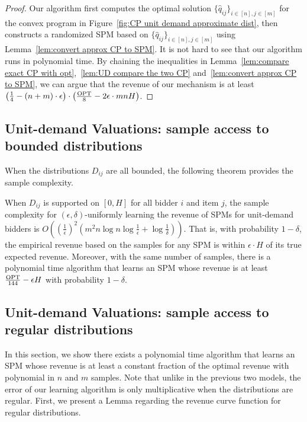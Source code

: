 \begin{proof}
	Our algorithm first computes the optimal solution $\{\hat{q}_{ij}\}_{i\in[n],j\in[m]}$ for the convex program in Figure~\ref{fig:CP unit demand approximate dist}, then  constructs a randomized SPM based on $\{\hat{q}_{ij}\}_{i\in[n],j\in[m]}$ using Lemma~\ref{lem:convert approx CP to SPM}. It is not hard to see that our algorithm runs in polynomial time. By chaining the inequalities in Lemma~\ref{lem:compare exact CP with opt},~\ref{lem:UD compare the two CP} and~\ref{lem:convert approx CP to SPM}, we can argue that the revenue of our mechanism is at least $\left(\frac{1}{4}-(n+m)\cdot \epsilon\right)\cdot\left(\frac{\text{OPT}}{8}-2\epsilon\cdot mnH\right)$.
\end{proof}

\subsection{Unit-demand Valuations: sample access to bounded distributions} 

When the distributions $D_{ij}$ are all bounded, the following theorem provides the sample complexity.
\begin{theorem}\cite{MorgensternR16}\label{thm:UD bounded}
	When $D_{ij}$ is supported on $[0,H]$ for all bidder $i$ and item $j$, the sample complexity for $(\epsilon,\delta)$-uniformly learning the revenue of SPMs for unit-demand bidders is $O\left(\left(\frac{1}{\epsilon}\right)^2 \left(m^2 n\log n\log \frac{1}{\epsilon} + \log \frac{1}{\delta}\right)\right)$. That is, with probability $1-\delta$, the empirical revenue based on the samples for any SPM is within $\epsilon\cdot H$ of its true expected revenue. %
	{Moreover, with the same number of samples, there is a polynomial time algorithm that learns an SPM whose revenue is at least $\frac{\text{OPT}}{144}-\epsilon H$ with probability $1-\delta$. }\end{theorem}

\subsection{Unit-demand Valuations: sample access to regular distributions}\label{sec:unit-demand regular}
In this section, we show there exists a polynomial time algorithm that learns an SPM whose revenue is at least a constant fraction of the optimal revenue with polynomial in $n$ and $m$ samples. Note that unlike in the previous two models, the error of our learning algorithm is only multiplicative when the distributions are regular. First, we present a Lemma regarding the revenue curve function for regular distributions.


